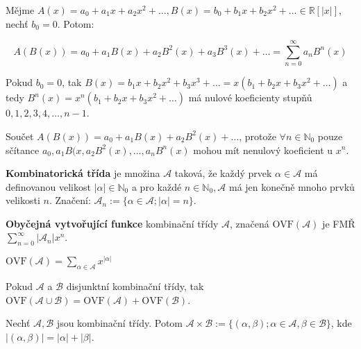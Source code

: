 \begin{definice}
	Mějme $A(x) = a_{0} + a_{1}x + a_{2}x^{2} + \dots, B(x) = b_{0} + b_{1} x + b_{2} x^{2} + \dots \in \mathbb{R}[|x|]$, nechť $b_{0} = 0$. Potom:
	
	$$
	A(B(x)) = a_{0} + a_{1}B(x) + a_{2}B^{2}(x) + a_{3}B^{3}(x) + \dots = \sum_{n = 0}^{\infty}a_{n}B^{n}(x)
	$$
\end{definice}

\begin{pozn}
	Pokud $b_{0} =0$, tak $B(x) = b_{1}x + b_{2}x^{2} + b_{3}x^{3} + \dots = x (b_{1} + b_{2} x + b_{3} x^{2} + \dots)$ a tedy $B^{n}(x) = x^{n}(b_{1} + b_{2} x + b_{3} x^{2} + \dots)$ má nulové koeficienty stupňů $0,1,2,3,4, \dots, n-1$.
\end{pozn}

Součet $A(B(x)) = a_{0} + a_{1}B(x) + a_{2}B^{2}(x) + \dots$, protože $\forall n \in \mathbb{N}_{0}$ pouze sčítance $a_{0}, a_{1}B(x, a_{2} B^{2}(x), \dots, a_{n}B^{n}(x)$ mohou mít nenulový koeficient u $x^{n}$.

\begin{definice}
	\textbf{Kombinatorická třída} je množina $\mathcal{A}$ taková, že každý prvek $\alpha \in \mathcal{A}$ má definovanou velikost $|\alpha| \in \mathbb{N}_{0}$ a pro každé $n \in \mathbb{N}_{0}, \mathcal{A}$ má jen konečně mnoho prvků velikosti $n$. Značení: $\mathcal{A}_{n}:=\{\alpha \in \mathcal{A}; |\alpha| = n\}$.
\end{definice}

\begin{definice}
	\textbf{Obyčejná vytvořující funkce} kombinační třídy $\mathcal{A}$, značená $\text{OVF}(\mathcal{A})$ je FMŘ $\sum_{n = 0}^{\infty} |\mathcal{A}_{n}|x^{n}$.
\end{definice}

\begin{pozor}
	$\text{OVF}(\mathcal{A}) = \sum_{\alpha \in \mathcal{A}} x^{|\alpha|}$
\end{pozor}

\begin{pozor}
	Pokud $\mathcal{A}$ a $\mathcal{B}$ disjunktní kombinační třídy, tak $\text{OVF}(\mathcal{A} \cup \mathcal{B}) = \text{OVF}(\mathcal{A}) + \text{OVF}(\mathcal{B})$.
\end{pozor}

\begin{definice}
	Nechť $\mathcal{A}, \mathcal{B}$ jsou kombinační třídy. Potom $\mathcal{A} \times \mathcal{B} := \{(\alpha,\beta); \alpha \in \mathcal{A}, \beta \in \mathcal{B}\}$, kde $|(\alpha, \beta)| = |\alpha| + |\beta|$.
\end{definice}

